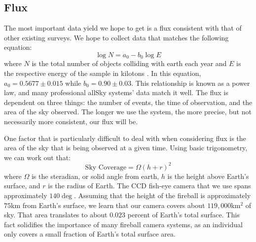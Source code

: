 \subsection{Flux}

The most important data yield we hope to get is a flux consistent with that of other existing surveys.
We hope to collect data that matches the following equation:
\begin{equation}
\log N = a_0 - b_0\log E
\label{eq:browneq}
\end{equation}
where $N$ is the total number of objects colliding with earth each year and $E$ is the respective energy of the sample in kilotons \cite{brown_p_flux_2002}.
In this equation, $a_0 = 0.5677 \pm 0.015$ while $b_0 = 0.90 \pm 0.03$.
This relationship is known as a power law, and many professional allSky systems' data match it well.
The flux is dependent on three things: the number of events, the time of observation, and the area of the sky observed.
The longer we use the system, the more precise, but not necessarily more consistent, our flux will be. 

One factor that is particularly difficult to deal with when considering flux is the area of the sky that is being observed at a given time.
Using basic trigonometry, we can work out that:
\begin{equation}
\text{Sky Coverage} = \Omega(h+r)^2
\label{eq:skycov}
\end{equation}
where $\Omega$ is the steradian, or solid angle from earth, $h$ is the height above Earth's surface, and $r$ is the radius of Earth. 
The CCD fish-eye camera that we use spans approximately $140\deg$.
Assuming that the height of the fireball is approximately $75$km from Earth's surface, we learn that our camera covers about $119,000$km$^2$ of sky.
That area translates to about $0.023$ percent of Earth's total surface.
This fact solidifies the importance of many fireball camera systems, as an individual only covers a small fraction of Earth's total surface area.

